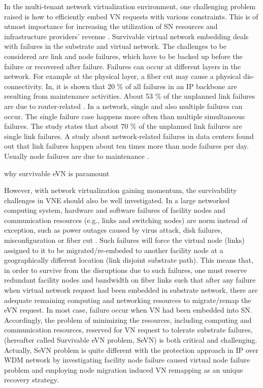 In the multi-tenant network virtualization environment, one challenging problem raised is how to efficiently embed VN requests with various constraints. This is of utmost importance for increasing the utilization of SN resources and infrastructure providers’ revenue \cite{koponen2014network}. Survivable virtual network embedding deals with failures in the substrate and virtual network. The challenges to be considered are link and node failures, which have to be backed up before the failure or recovered after failure. Failures can occur at different layers in the network. For example at the physical layer, a fiber cut
may cause a physical dis-connectivity. In\cite{markopoulou2004characterization}, it is shown that 20 \% of all failures in an IP backbone are resulting from
maintenance activities. About 53 \% of the unplanned link failures are due to router-related \cite{markopoulou2004characterization}. In a network, single
and also multiple failures can occur. The single failure case happens more often than multiple simultaneous failures. The study \cite{markopoulou2004characterization} states that about 70 \% of the unplanned link failures are single link failures. A study \cite{gill2011understanding} about network-related failures in data centers found out that link failures happen about ten times more than node failures per day. Usually node failures are due to maintenance \cite{gill2011understanding}.


why survivable eVN is paramount

However, with network virtualization gaining momentum, the survivability challenges in VNE should also be well investigated. In a large networked computing system, hardware and software failures of facility nodes and communication resources (e.g., links and switching nodes) are norm instead of exception, such as power outages caused by virus attack, disk failures, misconfiguration or fiber cut \cite{xu2012survivable,rahman2010survivable,rahman2013svne,guo2011shared,chen2010resilient}. Such failures will force the virtual node (links) assigned to it to be migrated/re-embeded to another facility node at a geographically different location (link disjoint substrate path). This means that, in order to survive from the disruptions due to such failures, one must reserve redundant facility nodes and bandwidth on fiber links such that after any failure when virtual network request had been embedded in substrate network, there are adequate remaining computing and networking resources to migrate/remap the eVN request. In most case, failure occur when VN had been embedded into SN. Accordingly, the problem of minimizing the resources, including computing and communication resources, reserved for VN request to tolerate substrate failures, (hereafter called Survivable eVN problem, SeVN) is both critical and challenging. Actually, SeVN problem is quite different with the protection approach
in IP over WDM network by investigating facility node failure caused virtual node failure problem and employing node migration induced VN remapping as an unique recovery strategy.


